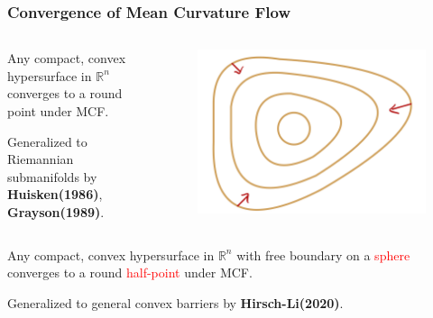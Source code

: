 \documentclass[pdf]{beamer}
\newcommand{\R}{\mathbb{R}}
\begin{document}
    \begin{frame}
        \frametitle{Convergence of Mean Curvature Flow}

        \begin{columns}[T]
                \begin{column}{.65\textwidth}
                    \begin{theorem}
                        \justifying
                        Any compact, convex hypersurface in $\R^n$ converges to a round point under MCF.
                    \end{theorem}
                    Generalized to Riemannian submanifolds by \textbf{Huisken(1986)}, \textbf{Grayson(1989)}.
                \end{column}
                \begin{column}{.35\textwidth}
                
            \begin{figure}[h]
                \includegraphics[scale=0.1]{HuCon.png}
            \end{figure}
            
                
                \end{column}
            \end{columns}
            \vspace{0.6cm}
            \begin{columns}[T]
                \begin{column}{.65\textwidth}
                    \begin{theorem}
                        \justifying
                        Any compact, convex hypersurface in $\R^n$ with free boundary on a \textcolor{red}{sphere} converges to a round \textcolor{red}{half-point} under MCF.
                    \end{theorem}
                    Generalized to general convex barriers by \textbf{Hirsch-Li(2020)}.
                \end{column}
                \begin{column}{.35\textwidth}
                

\end{column}
\end{columns}
\end{frame}
\end{document}
